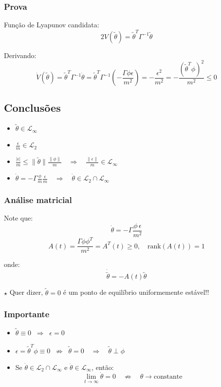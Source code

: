 \documentclass[10pt]{article}
\begin{document}
\subsubsection*{Prova}
Função de Lyapunov candidata:
\[
    2 V(\tilde{\theta}) = \tilde{\theta}^T \Gamma^{-1} \tilde{\theta}
\]

Derivando:
\[
    \dot{V}(\tilde{\theta}) = \tilde{\theta}^T \Gamma^{-1} \dot{\theta}
    = \tilde{\theta}^T \Gamma^{-1} \left(- \frac{\Gamma \phi \epsilon}{m^2}\right)
    = -\frac{\epsilon^2}{m^2} = -\frac{(\tilde{\theta}^T \phi)^2}{m^2} \leq 0
\]

\subsection*{Conclusões}
\begin{itemize}
    \item $\tilde{\theta} \in \mathcal{L}_\infty$
    \item $\frac{\epsilon}{m} \in \mathcal{L}_2$
    \item $\frac{|\epsilon|}{m} \leq \|\tilde{\theta}\| \frac{\|\phi\|}{m} \quad \Rightarrow \quad \frac{\|\epsilon\|}{m} \in \mathcal{L}_\infty$
    \item $\dot{\theta} = -\Gamma \frac{\phi}{m} \frac{\epsilon}{m} \quad \Rightarrow \quad \dot{\theta} \in \mathcal{L}_2 \cap \mathcal{L}_\infty$
\end{itemize}

\subsubsection*{Análise matricial}
Note que:
\[
    \dot{\theta} = -\Gamma \frac{\phi \, \epsilon}{m^2}
\]
\[
    A(t) = \frac{\Gamma \phi \phi^T}{m^2} = A^T(t) \geq 0, 
    \quad \text{rank}(A(t)) = 1
\]

onde:
\[
    \dot{\tilde{\theta}} = -A(t)\tilde{\theta}
\]

$\star$ \quad Quer dizer, $\tilde{\theta} = 0$ é um ponto de equilíbrio uniformemente estável!!

\subsubsection*{Importante}
\begin{itemize}
    \item $\tilde{\theta} \equiv 0 \;\;\Rightarrow\;\; \epsilon = 0$
    \item $\epsilon = \tilde{\theta}^T \phi \equiv 0 \;\;\not\Rightarrow\;\; \tilde{\theta}=0 \quad \Rightarrow \quad \tilde{\theta} \perp \phi$
    \item Se $\dot{\theta} \in \mathcal{L}_2 \cap \mathcal{L}_\infty$ e $\ddot{\theta} \in \mathcal{L}_\infty$, então:
    \[
        \lim_{t \to \infty} \dot{\theta} = 0 
        \quad \not\Rightarrow \quad 
        \theta \to \text{constante}
    \]
\end{itemize}
\end{document}
